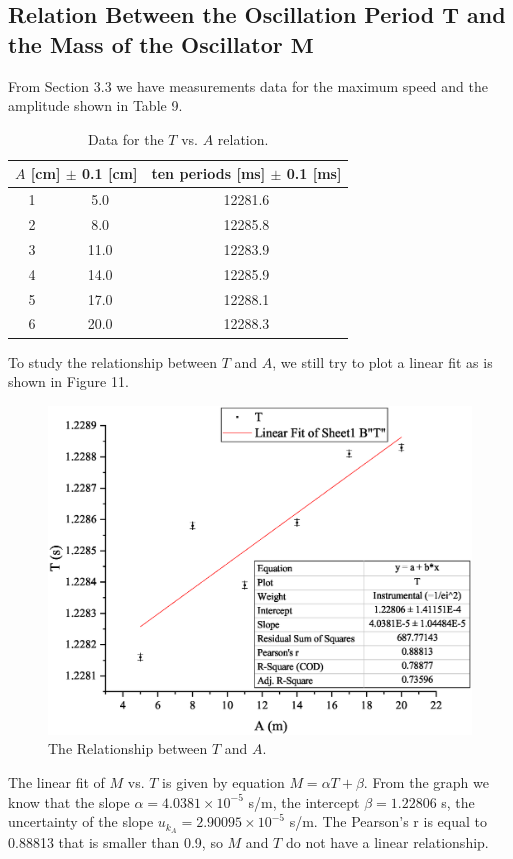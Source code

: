 \documentclass[a4paper]{report}
\begin{document}
	\subsection{Relation Between the Oscillation Period $\bm{T}$ and the Mass of the Oscillator $\bm{M}$}
	From Section 3.3 we have measurements data for the maximum speed and the amplitude shown in Table 9.
	\begin{table}[H]
		\centering
		\begin{tabular}{|c|c|c|}
			\hline
			\multicolumn{2}{|c|}{$A$ [cm] $\pm$ 0.1 [cm]}&ten periods [ms] $\pm$ 0.1 [ms]\\
			\hline
			1&5.0&12281.6\\
			\hline
			2&8.0&12285.8\\
			\hline
			3&11.0&12283.9\\
			\hline
			4&14.0&12285.9\\
			\hline
			5&17.0&12288.1\\
			\hline
			6&20.0&12288.3\\
			\hline
		\end{tabular}
	\caption{Data for the $T$ vs. $A$ relation.}
	\end{table}
	To study the relationship between $T$ and $A$, we still try to plot a linear fit as is shown in Figure 11.
	\begin{figure}[H]
		\centering
		\includegraphics[width=1\linewidth]{11.eps}
		\caption{The Relationship between $T$ and $A$.}
	\end{figure}
	The linear fit of $M$ vs. $T$ is given by equation $M=\alpha T+\beta$. From the graph we know that the slope $\alpha=4.0381\times10^{-5}$ s/m, the intercept $\beta=1.22806$ s, the uncertainty of the slope $u_{k_A}=2.90095\times10^{-5}$ s/m. The Pearson's r is equal to 0.88813 that is smaller than 0.9, so $M$ and $T$ do not have a linear relationship.
\end{document}
